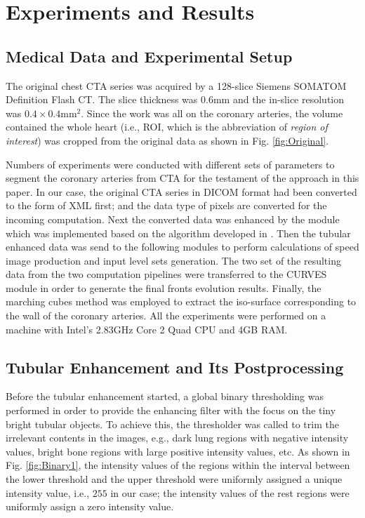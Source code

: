 \section{Experiments and Results}
\label{sec4_2}

\subsection{Medical Data and Experimental Setup}

The original chest CTA series was acquired by a 128-slice Siemens SOMATOM Definition Flash CT.
The slice thickness was $0.6 \text{mm}$ and the in-slice resolution was $0.4 \times 0.4 \text{mm}^2$.
Since the work was all on the coronary arteries, the volume contained the whole heart (i.e., ROI, which is the abbreviation of \textit{region of interest}) was cropped from the original data as shown in Fig. \ref{fig:Original}. %

Numbers of experiments were conducted with different sets of parameters to segment the coronary arteries from CTA for the testament of the approach in this paper.
In our case, the original CTA series in DICOM format had been converted to the form of XML first; and the data type of pixels are converted for the incoming computation.
Next the converted data was enhanced by the module which was implemented based on the algorithm developed in \cite{Sato1998}.
Then the tubular enhanced data was send to the following modules to perform calculations of speed image production and input level sets generation.
The two set of the resulting data from the two computation pipelines were transferred to the CURVES module in order to generate the final fronts evolution results.
Finally, the marching cubes method was employed to extract the iso-surface corresponding to the wall of the coronary arteries.
All the experiments were performed on a machine with Intel's 2.83GHz Core 2 Quad CPU and 4GB RAM.

\subsection{Tubular Enhancement and Its Postprocessing}

Before the tubular enhancement started, a global binary thresholding was performed in order to provide the enhancing filter with the focus on the tiny bright tubular objects.
To achieve this, the thresholder was called to trim the irrelevant contents in the images, e.g., dark lung regions with negative intensity values, bright bone regions with large positive intensity values, etc. %
As shown in Fig. \ref{fig:Binary1}, the intensity values of the regions within the interval between the lower threshold and the upper threshold were uniformly assigned a unique intensity value, i.e., $255$ in our case; the intensity values of the rest regions were uniformly assign a zero intensity value. %

